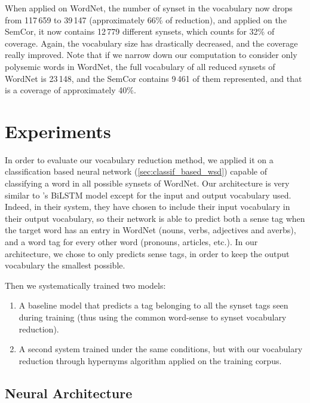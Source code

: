 \documentclass[11pt,a4paper]{article}
\begin{document}
When applied on WordNet, the number of synset in the vocabulary now drops from 117\,659 to 39\,147 (approximately 66\% of reduction), and applied on the SemCor, it now contains 12\,779 different synsets, which counts for 32\% of coverage. Again, the vocabulary size has drastically decreased, and the coverage really improved. Note that if we narrow down our computation to consider only polysemic words in WordNet, the full vocabulary of all reduced synsets of WordNet is 23\,148, and the SemCor contains 9\,461 of them represented, and that is a coverage of approximately 40\%.
















\section{Experiments}

In order to evaluate our vocabulary reduction method, we applied it on a classification based neural network (\autoref{sec:classif_based_wsd}) capable of classifying a word in all possible synsets of WordNet. Our architecture is very similar to \citet{raganato2017}'s BiLSTM model except for the input and output vocabulary used. Indeed, in their system, they have chosen to include their input vocabulary in their output vocabulary, so their network is able to predict both a sense tag when the target word has an entry in WordNet (nouns, verbs, adjectives and averbs), and a word tag for every other word (pronouns, articles, etc.). In our architecture, we chose to only predicts sense tags, in order to keep the output vocabulary the smallest possible.

Then we systematically trained two models:
\begin{enumerate}
    \item A baseline model that predicts a tag belonging to all the synset tags seen during training (thus using the common word-sense to synset vocabulary reduction).
    \item A second system trained under the same conditions, but with our vocabulary reduction through hypernyms algorithm applied on the training corpus.
\end{enumerate}

\subsection{Neural Architecture}
\end{document}
